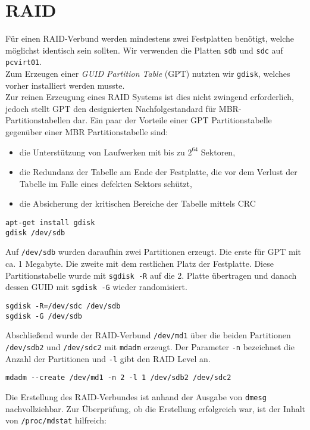 \section{RAID}
\label{raid}
Für einen RAID-Verbund werden mindestens zwei Festplatten benötigt, welche möglichst identisch sein sollten. Wir verwenden die Platten \verb#sdb# und \verb#sdc# auf \verb#pcvirt01#. \\
Zum Erzeugen einer \emph{GUID Partition Table} (GPT) nutzten wir \verb#gdisk#, welches vorher installiert werden musste. \\ 
Zur reinen Erzeugung eines RAID Systems ist dies nicht zwingend erforderlich, jedoch stellt GPT den designierten Nachfolgestandard für MBR-Partitionstabellen dar. Ein paar der Vorteile einer GPT Partitionstabelle gegenüber einer MBR Partitionstabelle sind\cite{gpt}:
\begin{itemize} 
\item die Unterstützung von Laufwerken mit bis zu $2^{64}$ Sektoren,
\item die Redundanz der Tabelle am Ende der Festplatte, die vor dem Verlust der Tabelle im Falle eines defekten Sektors schützt,
\item die Absicherung der kritischen Bereiche der Tabelle mittels CRC
\end{itemize}
\begin{verbatim}
apt-get install gdisk
gdisk /dev/sdb
\end{verbatim}
Auf \verb#/dev/sdb# wurden daraufhin zwei Partitionen erzeugt. Die erste für GPT mit ca. 1 Megabyte. Die zweite mit dem restlichen Platz der Festplatte.
Diese Partitionstabelle wurde mit \verb#sgdisk -R# auf die 2. Platte übertragen und danach dessen GUID mit \verb#sgdisk -G# wieder randomisiert.
\begin{verbatim}
sgdisk -R=/dev/sdc /dev/sdb
sgdisk -G /dev/sdb
\end{verbatim}
Abschließend wurde der RAID-Verbund \verb#/dev/md1# über die beiden Partitionen \verb#/dev/sdb2# und \verb#/dev/sdc2# mit \verb#mdadm# erzeugt. Der Parameter \verb#-n# bezeichnet die Anzahl der Partitionen und \verb#-l# gibt den RAID Level an.
\begin{verbatim}
mdadm --create /dev/md1 -n 2 -l 1 /dev/sdb2 /dev/sdc2
\end{verbatim}
Die Erstellung des RAID-Verbundes ist anhand der Ausgabe von \verb#dmesg# nachvollziehbar. Zur Überprüfung, ob die Erstellung erfolgreich war, ist der Inhalt von \verb#/proc/mdstat# hilfreich: 
